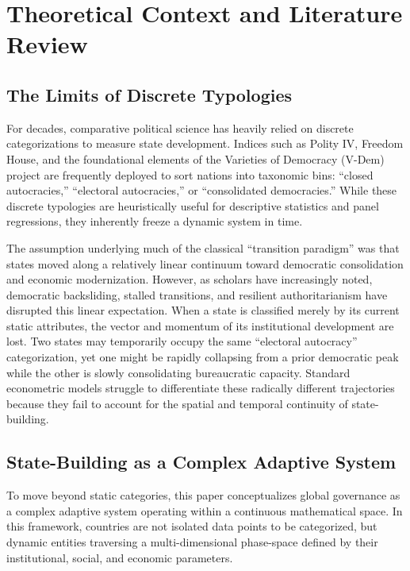 \documentclass[12pt]{article}
\begin{document}
\section{Theoretical Context and Literature Review}

\subsection{The Limits of Discrete Typologies}
For decades, comparative political science has heavily relied on discrete categorizations to measure state development. Indices such as Polity IV, Freedom House, and the foundational elements of the Varieties of Democracy (V-Dem) project \cite{coppedge2025vdem} are frequently deployed to sort nations into taxonomic bins: ``closed autocracies,'' ``electoral autocracies,'' or ``consolidated democracies.'' While these discrete typologies are heuristically useful for descriptive statistics and panel regressions, they inherently freeze a dynamic system in time.

The assumption underlying much of the classical ``transition paradigm'' was that states moved along a relatively linear continuum toward democratic consolidation and economic modernization. However, as scholars have increasingly noted, democratic backsliding, stalled transitions, and resilient authoritarianism have disrupted this linear expectation. When a state is classified merely by its current static attributes, the vector and momentum of its institutional development are lost. Two states may temporarily occupy the same ``electoral autocracy'' categorization, yet one might be rapidly collapsing from a prior democratic peak while the other is slowly consolidating bureaucratic capacity. Standard econometric models struggle to differentiate these radically different trajectories because they fail to account for the spatial and temporal continuity of state-building.

\subsection{State-Building as a Complex Adaptive System}
To move beyond static categories, this paper conceptualizes global governance as a complex adaptive system operating within a continuous mathematical space. In this framework, countries are not isolated data points to be categorized, but dynamic entities traversing a multi-dimensional phase-space defined by their institutional, social, and economic parameters.
\end{document}
